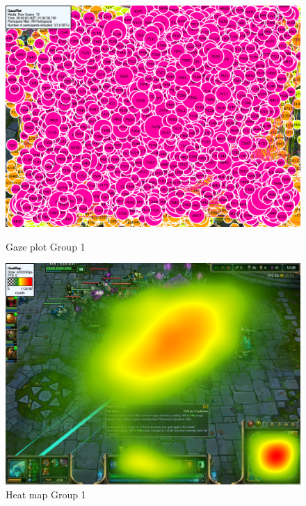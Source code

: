 \documentclass[notitlepage]{report}
\begin{document}
\begin{figure}[ht]
\begin{minipage}[b]{0.45\linewidth}
\centering
\includegraphics[width=\textwidth]{images/gazeplot/Noobs}
\caption{Gaze plot Group 1}
\label{gaze_noob}
\end{minipage}
\hspace{0.5cm}
\begin{minipage}[b]{0.45\linewidth}
\centering
\includegraphics[width=\textwidth]{images/heatmap/Noobs}
\caption{Heat map Group 1}
\label{heat_noob}
\end{minipage}
\end{figure}
\end{document}
